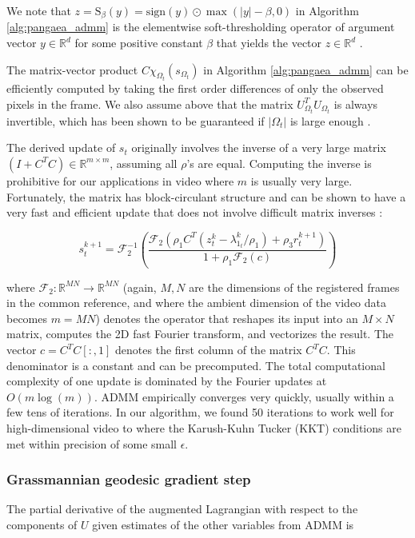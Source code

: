 \documentclass[10pt,twocolumn,letterpaper]{article}
\begin{document}
We note that $z = \text{S}_\beta(y) = \text{sign}(y) \odot \max(|y| - \beta, 0)$ in Algorithm \ref{alg:pangaea_admm} is the elementwise soft-thresholding operator of argument vector $y \in \mathbb{R}^d$ for some positive constant $\beta$ that yields the vector $z \in \mathbb{R}^d$ \cite{Beck2009AFI,fessler_lrmc}. 

The matrix-vector product $C \chi_{\Omega_t}(s_{\Omega_t})$ in Algorithm \ref{alg:pangaea_admm} can be efficiently computed by taking the first order differences of only the observed pixels in the frame. We also assume above that the matrix $U_{\Omega_t}^TU_{\Omega_t}$ is always invertible, which has been shown to be guaranteed if $|\Omega_t|$ is large enough \cite{balzano_recht}. 

The derived update of $s_t$ originally involves the inverse of a very large matrix $(I + C^TC) \in \mathbb{R}^{m \times m}$, assuming all $\rho$'s are equal. Computing the inverse is prohibitive for our applications in video where $m$ is usually very large. Fortunately, the matrix has block-circulant structure and can be shown to have a very fast and efficient update that does not involve difficult matrix inverses \cite{bcirculant_matrices}:

\begin{equation}
 s_{t}^{k+1}= \mathcal{F}^{-1}_2 \left (\frac{\mathcal{F}_2(\rho_1 C^T(z_t^k - \lambda_{1_t}^k/\rho_1) + \rho_3r_t^{k+1})}{1 + \rho_1 \mathcal{F}_2(c)} \right ) 
\end{equation}

\noindent where $\mathcal{F}_2 : \mathbb{R}^{MN} \rightarrow \mathbb{R}^{MN}$ (again, $M,N$ are the dimensions of the registered frames in the common reference, and where the ambient dimension of the video data becomes $m = MN$) denotes the operator that reshapes its input into an $M \times N$ matrix, computes the 2D fast Fourier transform, and vectorizes the result. The vector $c =C^TC[:, 1]$ denotes the first column of the matrix $C^TC$. This denominator is a constant and can be precomputed.  The total computational complexity of one update is dominated by the Fourier updates at $O(m\log(m))$. ADMM empirically converges very quickly, usually within a few tens of iterations. In our algorithm, we found 50 iterations to work well for high-dimensional video to where the Karush-Kuhn Tucker (KKT) conditions are met within precision of some small $\epsilon$. 

\subsubsection{Grassmannian geodesic gradient step}
The partial derivative of the augmented Lagrangian with respect to the components of $U$ given estimates of the other variables from ADMM is
\end{document}
